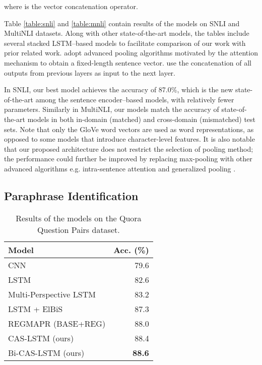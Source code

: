 \documentclass[wcp]{jmlr}
\begin{document}
    where  is the vector concatenation operator.
    
    Table \ref{table:snli} and \ref{table:mnli} contain results of the models on SNLI and MultiNLI datasets.
    Along with other state-of-the-art models, the tables include several stacked LSTM--based models to facilitate comparison of our work with prior related work.
    \citet{liu2016learning,chen2017gated,chen2018generalized} adopt advanced pooling algorithms motivated by the attention mechanism to obtain a fixed-length sentence vector.
    \citet{nie2017shortcut} use the concatenation of all outputs from previous layers as input to the next layer.
    
    In SNLI, our best model achieves the accuracy of 87.0\%, which is the new state-of-the-art among the sentence encoder--based models, with relatively fewer parameters.
    Similarly in MultiNLI, our models match the accuracy of state-of-the-art models in both in-domain (matched) and cross-domain (mismatched) test sets.
    Note that only the GloVe word vectors are used as word representations, as opposed to some models that introduce character-level features.
    It is also notable that our proposed architecture does not restrict the selection of pooling method; the performance could further be improved by replacing max-pooling with other advanced algorithms e.g. intra-sentence attention \citep{liu2016learning} and generalized pooling \citep{chen2018generalized}.
    
    \subsection{Paraphrase Identification}
    
    \begin{table}[t]
        \centering
        \begin{tabular}{l r}
            \hline
            \bf{Model} & \bf{Acc. (\%)} \\
            \hline
            CNN \citep{wang2017bilateral} & 79.6 \\
            LSTM \citep{wang2017bilateral} & 82.6 \\
            Multi-Perspective LSTM \citep{wang2017bilateral} & 83.2 \\
            LSTM + ElBiS \citep{choi2018elbis} & 87.3 \\
            REGMAPR (BASE+REG) \citep{brahma2018regmapr} & 88.0 \\
            \hline
            CAS-LSTM (ours) &  88.4 \\
            Bi-CAS-LSTM (ours) & \bf{88.6} \\
            \hline 
        \end{tabular}
        \caption{Results of the models on the Quora Question Pairs dataset.}
        \label{table:quora}
    \end{table}
    
\end{document}
